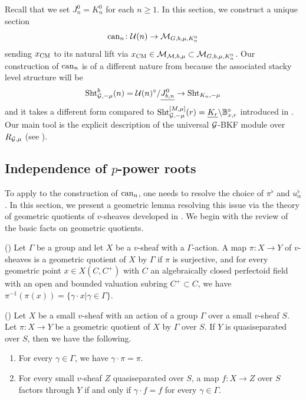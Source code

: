 \documentclass[12pt,reqno]{amsart}
\begin{document}
Recall that we set $J_n^0 = K_n^0$ for each $n \geq 1$. In this section, we construct a unique section 
\[
    {\operatorname{can}}_n \colon {\mathcal{U}}(n) \to {\mathcal{M}}_{G, b, \mu, K_n^0}
\]
sending $x_{\operatorname{CM}}$ to its natural lift via $x_{\operatorname{CM}} \in {\mathcal{M}}_{{\mathcal{M}}, b, \mu} \subset {\mathcal{M}}_{G, b, \mu, K_n^0}$. Our construction of ${\operatorname{can}}_n$ is of a different nature from  because the associated stacky level structure will be 
\[
    {\operatorname{Sht}}^b_{{\mathcal{G}}, -\mu}(n) = {\mathcal{U}}(n)^\diamond / {\underline{J_{b, n}^0}} \to {\operatorname{Sht}}_{K_n, -\mu}
\]
and it takes a different form compared to ${\operatorname{Sht}}_{{\mathcal{G}}, -\mu}^{[M, \mu]}(r) = {\underline{K_r}} \backslash \mathbb{B}_{x, r}^\diamond$ introduced in . Our main tool is the explicit description of the universal ${\mathcal{G}}$-BKF module over $R_{{\mathcal{G}}, \mu}$ (see ).

\subsection{Independence of $p$-power roots} \label{ssec:indepedence_p-power}

To apply  to the construction of ${\operatorname{can}}_n$, one needs to resolve the choice of $\pi^\flat$ and $u_\alpha^\flat$. In this section, we present a geometric lemma resolving this issue via the theory of geometric quotients of $v$-sheaves developed in \cite[Section 3.3]{Tak26_rel}. We begin with the review of the basic facts on geometric quotients. 

\begin{defi}\textup{(\cite[Definition 3.9]{Tak26_rel})}
    Let $\Gamma$ be a group and let $X$ be a $v$-sheaf with a $\Gamma$-action. A map $\pi\colon X\to Y$ of $v$-sheaves is a geometric quotient of $X$ by $\Gamma$ if $\pi$ is surjective, and for every geometric point $x\in X(C,C^+)$ with $C$ an algebraically closed perfectoid field with an open and bounded valuation subring $C^+\subset C$, we have $\pi^{-1}(\pi(x)) = \{ \gamma \cdot x \vert \gamma \in \Gamma \}$. 
\end{defi}
\begin{prop}\textup{(\cite[Proposition 3.11]{Tak26_rel})}
    \label{prop:geomquotiscat}
    Let $X$ be a small $v$-sheaf with an action of a group $\Gamma$ over a small $v$-sheaf $S$. Let $\pi\colon X\to Y$ be a geometric quotient of $X$ by $\Gamma$ over $S$. If $Y$ is quasiseparated over $S$, then we have the following. 
    \begin{enumerate}
        \item For every $\gamma\in \Gamma$, we have $\gamma\cdot \pi=\pi$. 
        \item For every small $v$-sheaf $Z$ quasiseparated over $S$, a map $f\colon X \to Z$ over $S$ factors through $Y$ if and only if $\gamma\cdot f=f$ for every $\gamma\in \Gamma$. 
    \end{enumerate}
\end{prop}
\end{document}
